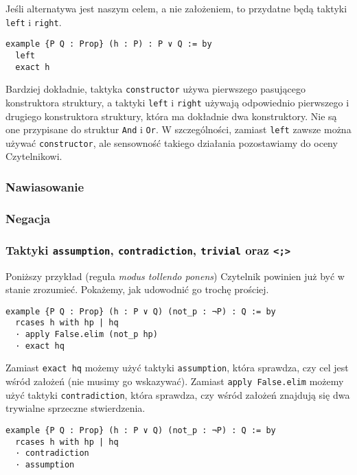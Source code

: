 \documentclass[polish,pretty]{angav}
\newcommand{\Lean}[1]{\texttt{#1}}
\begin{document}
Jeśli alternatywa jest naszym celem, a nie założeniem, to przydatne będą taktyki \Lean{left} i \Lean{right}.

\begin{verbatim}
example {P Q : Prop} (h : P) : P ∨ Q := by
  left
  exact h
\end{verbatim}

\begin{remark}
    Bardziej dokładnie, taktyka \Lean{constructor} używa pierwszego pasującego konstruktora struktury, a taktyki \Lean{left} i \Lean{right} używają odpowiednio pierwszego i drugiego konstruktora struktury, która ma dokładnie dwa konstruktory. Nie są one przypisane do struktur \Lean{And} i \Lean{Or}. W szczególności, zamiast \Lean{left} zawsze można używać \Lean{constructor}, ale sensowność takiego działania pozostawiamy do oceny Czytelnikowi.
\end{remark}

\subsubsection*{Nawiasowanie}

\subsubsection*{Negacja}

\subsubsection*{Taktyki \texttt{assumption}, \texttt{contradiction}, \texttt{trivial} oraz \texttt{<;>}}

Poniższy przykład (reguła \textit{modus tollendo ponens}) Czytelnik powinien już być w stanie zrozumieć. Pokażemy, jak udowodnić go trochę prościej.
\begin{verbatim}
example {P Q : Prop} (h : P ∨ Q) (not_p : ¬P) : Q := by
  rcases h with hp | hq
  · apply False.elim (not_p hp)
  · exact hq
\end{verbatim}

Zamiast \Lean{exact hq} możemy użyć taktyki \Lean{assumption}, która sprawdza, czy cel jest wśród założeń (nie musimy go wskazywać). Zamiast \Lean{apply False.elim} możemy użyć taktyki \Lean{contradiction}, która sprawdza, czy wśród założeń znajdują się dwa trywialne sprzeczne stwierdzenia.
\begin{verbatim}
example {P Q : Prop} (h : P ∨ Q) (not_p : ¬P) : Q := by
  rcases h with hp | hq
  · contradiction
  · assumption
\end{verbatim}
\end{document}
